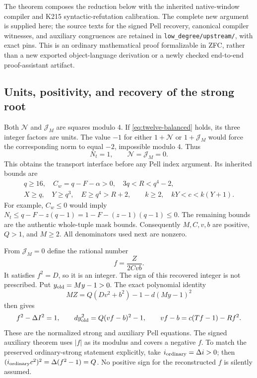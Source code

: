 The theorem composes the reduction below with the inherited native-window
compiler and K215 syntactic-refutation calibration.  The complete new
argument is supplied here; the source texts for the signed Pell recovery,
canonical compiler witnesses, and auxiliary congruences are retained in
\texttt{low\_degree/upstream/}, with exact pins.  This is an ordinary
mathematical proof formalizable in ZFC, rather than a new exported
object-language derivation or a newly checked end-to-end proof-assistant
artifact.

\subsection{Units, positivity, and recovery of the strong root}

Both $\mathcal N$ and $\mathcal J_M$ are squares modulo $4$.  If
\eqref{eq:twelve-balanced} holds, its three integer factors are units.
The value $-1$ for either $1+\mathcal N$ or $1+\mathcal J_M$ would force
the corresponding norm to equal $-2$, impossible modulo $4$.  Thus
\begin{equation}
 N_t=1,\qquad \mathcal N=\mathcal J_M=0.
 \label{eq:low-units}
\end{equation}
This obtains the transport interface before any Pell index argument.  Its
inherited bounds are
\begin{equation}
\begin{gathered}
 q\ge16,\quad C_w=q-F-\alpha>0,\quad 3q<R<q^4-2,\\
 X\ge q,\quad Y\ge q^3,\quad E\ge q^4>R+2,\qquad
 k\ge2,\quad kY<c<k(Y+1).
\end{gathered}
\label{eq:low-outer}
\end{equation}
For example, $C_w\le0$ would imply
$N_t\le q-F-z(q-1)=1-F-(z-1)(q-1)\le0$.  The remaining bounds are the
authentic whole-tuple mask bounds.  Consequently $M,C,v,b$ are positive,
$Q>1$, and $M\ge2$.  All denominators used next are nonzero.

From $\mathcal J_M=0$ define the rational number
\[
 f=\frac{Z}{2Cvb}.
\]
It satisfies $f^2=D$, so it is an integer.  The sign of this recovered
integer is not prescribed.  Put $y_{\rm old}=My-1>0$.  The exact polynomial
identity
\begin{equation}
 MZ=Q(Dv^2+b^2)-1-d(My-1)^2
 \label{eq:quotient-identity}
\end{equation}
then gives
\begin{equation}
 f^2-\Delta I^2=1,\qquad
 d y_{\rm old}^2=Q(vf-b)^2-1,
 \qquad vf-b=c(Tf-1)-Rf^2.
 \label{eq:low-strong-aux}
\end{equation}
These are the normalized strong and auxiliary Pell equations.  The signed
auxiliary theorem uses $|f|$ as its modulus and covers a negative $f$.
To match the preserved ordinary-strong statement explicitly, take
$i_{\rm ordinary}=\Delta i>0$; then
$(i_{\rm ordinary}c^2)^2=\Delta(f^2-1)=Q$.  No positive sign for the
reconstructed $f$ is silently assumed.

